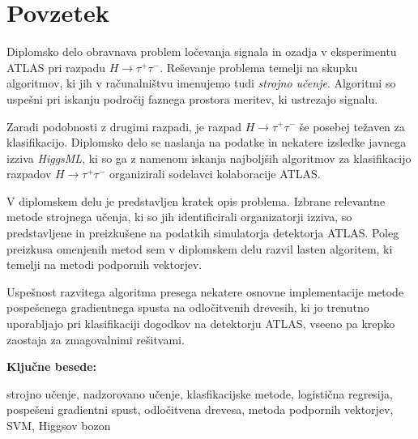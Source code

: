 \documentclass[11pt,a4paper,openany]{book}
\begin{document}







\chapter*{Povzetek}
\noindent Diplomsko delo obravnava problem ločevanja signala in ozadja v eksperimentu ATLAS pri razpadu $H \rightarrow \tau^+\tau^-$. Reševanje problema temelji na skupku algoritmov, ki jih v računalništvu imenujemo tudi \textit{strojno učenje}. Algoritmi so uspešni pri iskanju področij faznega prostora meritev, ki ustrezajo signalu.

Zaradi podobnosti z drugimi razpadi, je razpad $H \rightarrow \tau^+\tau^-$ še posebej težaven za klasifikacijo. Diplomsko delo se naslanja na podatke in nekatere izsledke javnega izziva \textit{HiggsML}, ki so ga z namenom iskanja najboljših algoritmov za klasifikacijo razpadov $H \rightarrow \tau^+\tau^-$ organizirali sodelavci kolaboracije ATLAS.

V diplomskem delu je predstavljen kratek opis problema. Izbrane relevantne metode strojnega učenja, ki so jih identificirali organizatorji izziva, so predstavljene in preizkušene na podatkih simulatorja detektorja ATLAS. Poleg preizkusa omenjenih metod sem v diplomskem delu razvil lasten algoritem, ki temelji na metodi podpornih vektorjev.

Uspešnost razvitega algoritma presega nekatere osnovne implementacije metode pospešenega gradientnega spusta na odločitvenih drevesih, ki jo trenutno uporabljajo pri klasifikaciji dogodkov na detektorju ATLAS, vseeno pa krepko zaostaja za zmagovalnimi rešitvami.


\vspace{1.3cm}



{\large \bf Ključne besede:}

\vspace{0.5cm}
\noindent strojno učenje, nadzorovano učenje, klasfikacijske metode, logistična regresija, pospešeni gradientni spust, odločitvena drevesa, metoda podpornih vektorjev, SVM, Higgsov bozon
\end{document}
